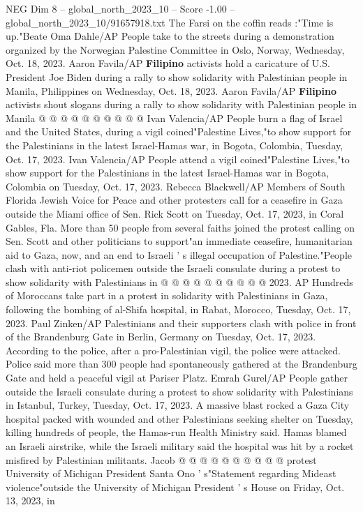 \begin{textsample}{NEG Dim 8 – global\_north\_2023\_10 – Score -1.00 – global\_north\_2023\_10/91657918.txt}
The Farsi on the coffin reads :"Time is up."Beate Oma Dahle/AP People take to the streets during a demonstration organized by the Norwegian Palestine Committee in Oslo, Norway, Wednesday, Oct. 18, 2023.
Aaron Favila/AP \textbf{Filipino} activists hold a caricature of U.S.
President Joe Biden during a rally to show solidarity with Palestinian people in Manila, Philippines on Wednesday, Oct. 18, 2023.
Aaron Favila/AP \textbf{Filipino} activists shout slogans during a rally to show solidarity with Palestinian people in Manila @ @ @ @ @ @ @ @ @ @ Ivan Valencia/AP People burn a flag of Israel and the United States, during a vigil coined"Palestine Lives,"to show support for the Palestinians in the latest Israel-Hamas war, in Bogota, Colombia, Tuesday, Oct. 17, 2023.
Ivan Valencia/AP People attend a vigil coined"Palestine Lives,"to show support for the Palestinians in the latest Israel-Hamas war in Bogota, Colombia on Tuesday, Oct. 17, 2023.
Rebecca Blackwell/AP Members of South Florida Jewish Voice for Peace and other protesters call for a ceasefire in Gaza outside the Miami office of Sen.
Rick Scott on Tuesday, Oct. 17, 2023, in Coral Gables, Fla.
More than 50 people from several faiths joined the protest calling on Sen.
Scott and other politicians to support"an immediate ceasefire, humanitarian aid to Gaza, now, and an end to Israeli ' s illegal occupation of Palestine."People clash with anti-riot policemen outside the Israeli consulate during a protest to show solidarity with Palestinians in @ @ @ @ @ @ @ @ @ @ 2023.
AP Hundreds of Moroccans take part in a protest in solidarity with Palestinians in Gaza, following the bombing of al-Shifa hospital, in Rabat, Morocco, Tuesday, Oct. 17, 2023.
Paul Zinken/AP Palestinians and their supporters clash with police in front of the Brandenburg Gate in Berlin, Germany on Tuesday, Oct. 17, 2023.
According to the police, after a pro-Palestinian vigil, the police were attacked.
Police said more than 300 people had spontaneously gathered at the Brandenburg Gate and held a peaceful vigil at Pariser Platz.
Emrah Gurel/AP People gather outside the Israeli consulate during a protest to show solidarity with Palestinians in Istanbul, Turkey, Tuesday, Oct. 17, 2023.
A massive blast rocked a Gaza City hospital packed with wounded and other Palestinians seeking shelter on Tuesday, killing hundreds of people, the Hamas-run Health Ministry said.
Hamas blamed an Israeli airstrike, while the Israeli military said the hospital was hit by a rocket misfired by Palestinian militants.
Jacob @ @ @ @ @ @ @ @ @ @ protest University of Michigan President Santa Ono ' s"Statement regarding Mideast violence"outside the University of Michigan President ' s House on Friday, Oct. 13, 2023, in

\end{textsample}
